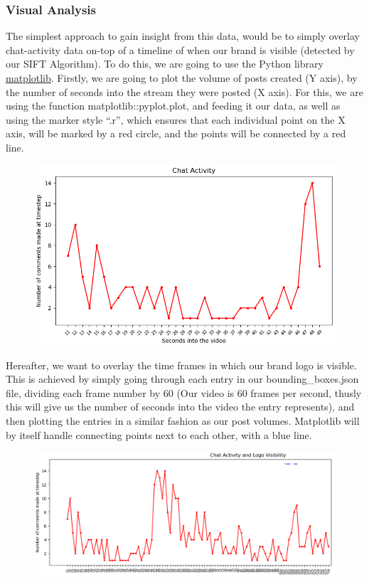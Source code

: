 \documentclass{article}
\begin{document}
\subsubsection{Visual Analysis}
The simplest approach to gain insight from this data,
would be to simply overlay chat-activity data on-top of
a timeline of when our brand is visible (detected by our
SIFT Algorithm). To do this, we are going to use the Python
library \href{https://matplotlib.org/}{matplotlib}.
\newline\newline
Firstly, we are going to plot the volume of posts
created (Y axis), by the number of seconds into the
stream they were posted (X axis). For this, we are using
the function matplotlib::pyplot.plot, and feeding it our
data, as well as using the marker style “.r”, which ensures
that each individual point on the X axis, will be marked by
a red circle, and the points will be connected by a red line.
\begin{figure}[H]
  \centering
  \includegraphics[width=\linewidth]{./resources/chat_activity_pr_second.PNG}
\end{figure}

Hereafter, we want to overlay the time frames in which
our brand logo is visible. This is achieved by simply
going through each entry in our bounding\_boxes.json file,
dividing each frame number by 60 (Our video is 60 frames
per second, thusly this will give us the number of seconds
into the video the entry represents), and then plotting the
entries in a similar fashion as our post volumes.
Matplotlib will by itself handle connecting points
next to each other, with a blue line. 

\begin{figure}[H]
  \centering
  \includegraphics[width=\linewidth]{./resources/chat_and_logo_visibility.png}
\end{figure}
\end{document}
